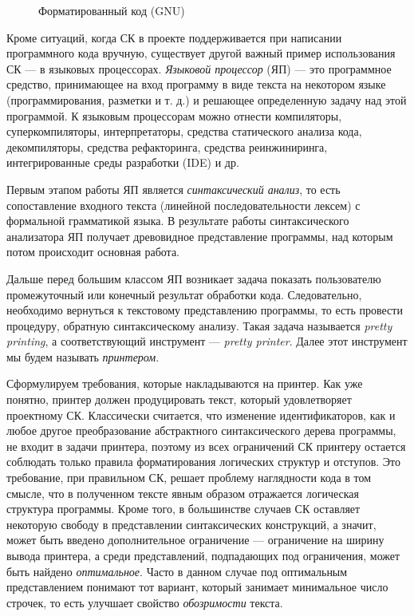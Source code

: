 \begin{figure}[h!]
	\centering
	
  \caption{Форматированный код (GNU)}
	\label{fig:wikiExGNU}
\end{figure}

Кроме ситуаций, когда СК в проекте поддерживается при написании
программного кода вручную, существует другой важный пример использования СК ---
в языковых процессорах. \emph{Языковой процессор} (ЯП) ---
это программное средство, принимающее на вход программу в виде текста
на некотором языке (программирования, разметки и т. д.) и решающее
определенную задачу над этой программой. К языковым процессорам можно
отнести компиляторы, суперкомпиляторы, интерпретаторы,
средства статического анализа кода, декомпиляторы, средства рефакторинга,
средства реинжиниринга, интегрированные среды разработки (IDE) и др.

Первым этапом работы ЯП является \emph{синтаксический анализ}, то есть
сопоставление входного текста (линейной последовательности лексем) с формальной
грамматикой языка. В результате работы синтаксического анализатора ЯП получает
древовидное представление программы, над которым потом происходит основная работа.

Дальше перед большим классом ЯП возникает задача показать пользователю
промежуточный или конечный результат обработки кода.
Следовательно, необходимо вернуться к текстовому представлению программы,
то есть провести процедуру, обратную синтаксическому анализу. Такая задача
называется \emph{pretty printing}, а соответствующий инструмент ---
\emph{pretty printer}. Далее этот инструмент мы будем называть
\emph{принтером}.

Сформулируем требования, которые накладываются на принтер.
Как уже понятно, принтер должен
продуцировать текст, который удовлетворяет проектному СК.
Классически считается, что изменение идентификаторов, как и любое другое
преобразование абстрактного синтаксического дерева программы, не входит в
задачи принтера, поэтому из всех ограничений СК принтеру остается 
соблюдать только правила форматирования логических структур и отступов.
Это требование, при правильном СК, решает проблему наглядности кода в том смысле,
что в полученном тексте явным образом отражается логическая структура программы.
Кроме того, в большинстве случаев СК оставляет некоторую свободу в представлении
синтаксических конструкций, а значит, может быть введено дополнительное
ограничение --- ограничение на ширину вывода принтера, а среди 
представлений, подпадающих под ограничения, может быть
найдено \emph{оптимальное}. Часто в данном случае под
оптимальным представлением понимают тот вариант,
который занимает минимальное число строчек,
то есть улучшает свойство \emph{обозримости} текста.

